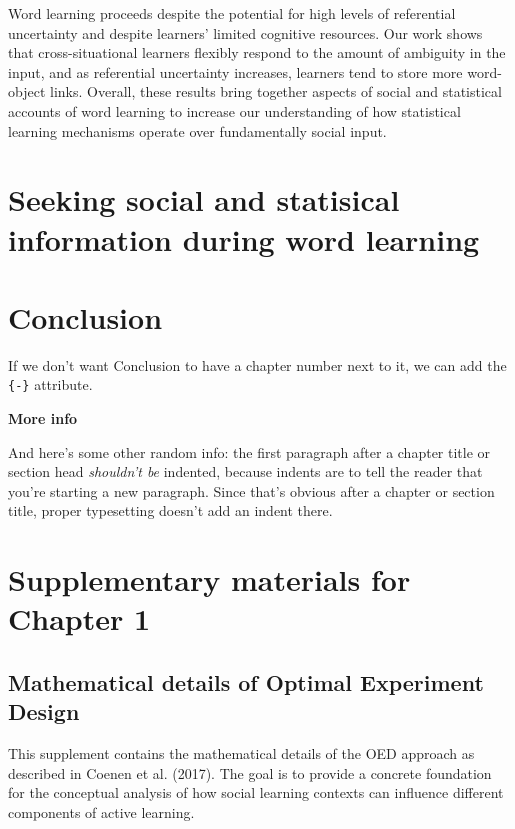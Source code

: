 \documentclass[oneside]{report}
\begin{document}
Word learning proceeds despite the potential for high levels of
referential uncertainty and despite learners' limited cognitive
resources. Our work shows that cross-situational learners flexibly
respond to the amount of ambiguity in the input, and as referential
uncertainty increases, learners tend to store more word-object links.
Overall, these results bring together aspects of social and statistical
accounts of word learning to increase our understanding of how
statistical learning mechanisms operate over fundamentally social input.

\hypertarget{speed-nov}{%
\chapter{Seeking social and statisical information during word
learning}\label{speed-nov}}

\hypertarget{conclusion}{%
\chapter*{Conclusion}\label{conclusion}}

If we don't want Conclusion to have a chapter number next to it, we can
add the \texttt{\{-\}} attribute.

\textbf{More info}

And here's some other random info: the first paragraph after a chapter
title or section head \emph{shouldn't be} indented, because indents are
to tell the reader that you're starting a new paragraph. Since that's
obvious after a chapter or section title, proper typesetting doesn't add
an indent there.

\appendix

\hypertarget{supplementary-materials-for-chapter-1}{%
\chapter{Supplementary materials for Chapter
1}\label{supplementary-materials-for-chapter-1}}

\hypertarget{mathematical-details-of-optimal-experiment-design}{%
\section{Mathematical details of Optimal Experiment
Design}\label{mathematical-details-of-optimal-experiment-design}}

This supplement contains the mathematical details of the OED approach as
described in Coenen et al. (2017). The goal is to provide a concrete
foundation for the conceptual analysis of how social learning contexts
can influence different components of active learning.
\end{document}
